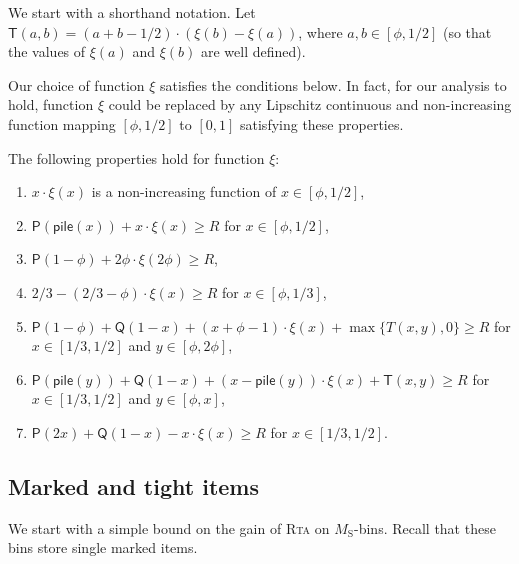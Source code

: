 \documentclass[a4paper,USenglish,cleveref]{lipics-v2019}
\newcommand{\R}{\ensuremath{R}}
\newcommand{\M}{\ensuremath{M_\mathrm{S}}\xspace}
\newcommand{\smallBoundary}{\ensuremath{\phi}}
\newcommand{\g}{\ensuremath{\xi}}
\newcommand{\water}{\textsf{Q}}
\newcommand{\cutintegral}{\textsf{P}}
\newcommand{\stack}{\textsf{pile}}
\newcommand{\T}{\textsf{T}}
\newcommand{\ALG}{\textsc{Rta}\xspace}
\begin{document}
We start with a shorthand notation. Let $\T(a,b)  =  (a+b-1/2) \cdot (\g(b) - \g(a))$,
where $a, b \in [\smallBoundary, 1/2]$ (so that the values of $\g(a)$ and
$\g(b)$ are well defined).

Our choice of function $\g$ satisfies the conditions below. In fact, for our
analysis to hold, function $\g$ could be replaced by any Lipschitz continuous
and non-increasing function mapping $[\smallBoundary, 1/2]$ to $[0,1]$
satisfying these properties.

\begin{lemma}
\label{lem:g-properties}
The following properties hold for function $\g$:
\begin{enumerate}
  \item $x \cdot \g(x)$ is a non-increasing function of $x \in [\smallBoundary, 1/2]$,
    \label{item:g-area}
  \item 
    $\cutintegral(\stack(x)) + x \cdot \g(x) \geq \R$ for $x \in [\smallBoundary,1/2]$,
    \label{item:g-prop-0}
  \item 
    $\cutintegral(1-\smallBoundary) + 2 \smallBoundary \cdot \g(2 \smallBoundary) \geq \R$,
    \label{item:g-prop-phi}
  \item $2/3 - (2/3 - \smallBoundary) \cdot \g(x) \geq \R$ for $x \in [\smallBoundary, 1/3]$,
    \label{item:g-upper-bound}
  \item
    $\cutintegral(1-\smallBoundary) + \water(1-x) + (x+\smallBoundary-1) \cdot \g(x) + \max\{T(x,y),0\}
    \geq \R$
      for $x \in [1/3, 1/2]$ and $y \in [\smallBoundary, 2 \smallBoundary]$,
    \label{item:g-2dim-1}
  \item 
    $\cutintegral(\stack(y)) + \water(1-x) + (x - \stack(y)) \cdot \g(x) + \T(x,y) \geq \R$
    for $x \in [1/3, 1/2]$ and $y \in [\smallBoundary, x]$,
    \label{item:g-2dim-2}
  \item 
    $\cutintegral(2x) + \water(1-x)  - x \cdot \g(x) \geq \R$ for $x \in [1/3,1/2]$.
    \label{item:g-prop-1}
\end{enumerate}
\end{lemma}
  


\subsection{Marked and tight items}

We start with a simple bound on the gain of \ALG on \M-bins. Recall that these
bins store single marked items.
\end{document}
